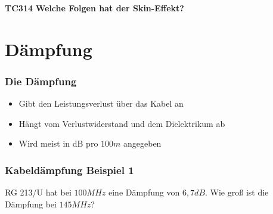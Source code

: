 \begin{frame}
    \textbf{TC314}  \textbf{Welche Folgen hat der Skin-Effekt?}\\
\end{frame}

\section{D\"ampfung}
\begin{frame}
  \frametitle{Die Dämpfung}
  \begin{itemize}
    \item Gibt den Leistungsverlust über das Kabel an
    \item Hängt vom Verlustwiderstand und dem Dielektrikum ab
    \item Wird meist in dB pro $100m$ angegeben
  \end{itemize}
\end{frame}

\begin{frame}
  \frametitle{Kabeldämpfung Beispiel 1}

  \begin{exampleblock}{RG 213/U hat bei $100MHz$ eine Dämpfung von $6,7dB$.
    Wie groß ist die Dämpfung bei $145MHz$?}
  \end{exampleblock}

\end{frame}

